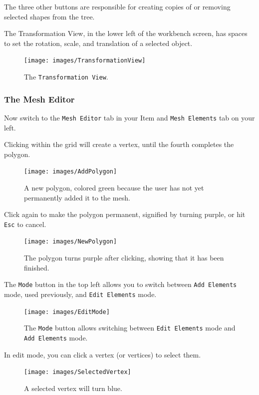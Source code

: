 The three other buttons are responsible for creating copies of or removing
selected shapes from the tree. 

The Transformation View, in the lower left of the workbench screen, has spaces
to set the rotation, scale, and translation of a selected object.

\begin{figure}[!h]
\texttt{[image: images/TransformationView]}
\centering
\caption{The \texttt{Transformation View}.}
\label{fig:transformationview}
\end{figure}

\subsubsection{The Mesh Editor}

Now switch to the \texttt{Mesh Editor} tab in your Item and \texttt{Mesh
Elements} tab on your left.

Clicking within the grid will create a vertex, until the fourth completes the
polygon.

\begin{figure}[!h]
\texttt{[image: images/AddPolygon]}
\centering
\caption{A new polygon, colored green because the user has not yet permanently
added it to the mesh.}
\label{fig:addpolygon}
\end{figure}

Click again to make the polygon permanent, signified by turning purple, or hit
\texttt{Esc} to cancel.

\begin{figure}[!h]
\texttt{[image: images/NewPolygon]}
\centering
\caption{The polygon turns purple after clicking, showing that it has been
finished.}
\label{fig:newpolygon}
\end{figure}

The \texttt{Mode} button in the top left allows you to switch between
\texttt{Add Elements} mode, used previously, and \texttt{Edit Elements} mode.

\begin{figure}[!h]
\texttt{[image: images/EditMode]}
\centering
\caption{The \texttt{Mode} button allows switching between \texttt{Edit
Elements} mode and \texttt{Add Elements} mode.}
\label{fig:editmode}
\end{figure}

In edit mode, you can click a vertex (or vertices) to select them. 

\begin{figure}[!h]
\texttt{[image: images/SelectedVertex]}
\centering
\caption{A selected vertex will turn blue.}
\label{fig:selectedvertex}
\end{figure}

